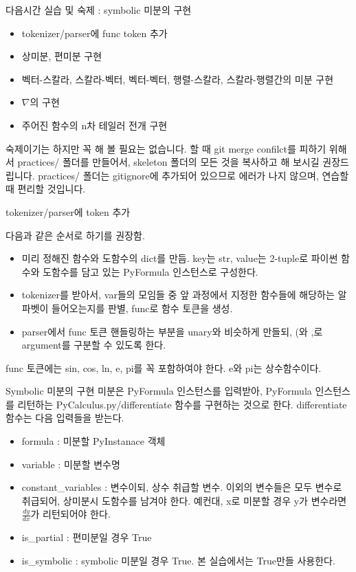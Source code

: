 \documentclass{beamer}
\begin{document}
\begin{frame}{다음시간 실습 및 숙제 : symbolic 미분의 구현} 

\begin{itemize} 
\item tokenizer/parser에 func token 추가 
\item 상미분, 편미분 구현
\item 벡터-스칼라, 스칼라-벡터, 벡터-벡터, 행렬-스칼라, 스칼라-행렬간의 미분 구현 
\item $\nabla$의 구현 
\item  주어진 함수의 n차 테일러 전개 구현 
\end{itemize}

숙제이기는 하지만 꼭 해 볼 필요는 없습니다. 할 때 git merge confilct를 피하기 위해서 practices/ 폴더를 만들어서, skeleton 폴더의 모든 것을 복사하고 해 보시길 권장드립니다. practices/ 폴더는 gitignore에 추가되어 있으므로 에러가 나지 않으며, 연습할 때 편리할 것입니다. 
\end{frame}


\begin{frame}{tokenizer/parser에 token 추가} 

다음과 같은 순서로 하기를 권장함. 
\begin{itemize} 
\item 미리 정해진 함수와 도함수의 dict를 만듬. key는 str, value는 2-tuple로 파이썬 함수와 도함수를 담고 있는 PyFormula 인스턴스로 구성한다. 
\item tokenizer를 받아서, var들의 모임들 중 앞 과정에서 지정한 함수들에 해당하는 알파벳이 들어오는지를 판별, func로 함수 토큰을 생성. 
\item parser에서 func 토큰 핸들링하는 부분을 unary와 비슷하게 만들되, (와 ,로 argument를 구분할 수 있도록 한다. 
\end{itemize}

func 토큰에는 sin, cos, ln, e, pi를 꼭 포함하여야 한다. e와 pi는 상수함수이다. 
\end{frame}


\begin{frame}{Symbolic 미분의 구현} 
미분은 PyFormula 인스턴스를 입력받아, PyFormula 인스턴스를 리턴하는 PyCalculus.py/differentiate 함수를 구현하는 것으로 한다. differentiate 함수는 다음 입력들을 받는다. 
\begin{itemize} 
\item formula : 미분할 PyInstanace 객체 
\item variable : 미분할 변수명 
\item constant\_variables : 변수이되, 상수 취급할 변수. 이외의 변수들은 모두 변수로 취급되어, 상미분시 도함수를 남겨야 한다. 예컨대, x로 미분할 경우 y가 변수라면 $\frac{dy}{dx}$가 리턴되어야 한다. 
\item is\_partial : 편미분일 경우 True
\item is\_symbolic : symbolic 미분일 경우 True. 본 실습에서는 True만들 사용한다. 
\end{itemize}
\end{frame}
\end{document}
